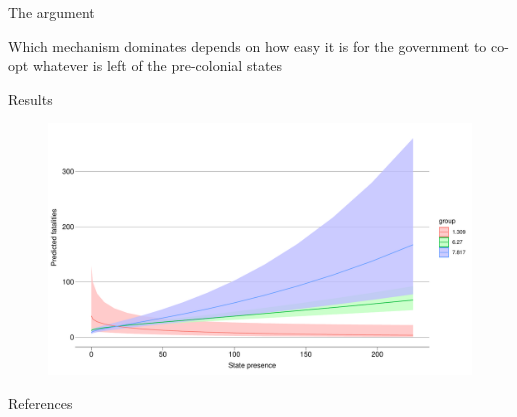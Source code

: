 \documentclass{beamer}
\begin{document}
\begin{frame}{The argument}

	Which mechanism dominates depends on how easy it is for the government
	to co-opt whatever is left of the pre-colonial states %

\end{frame}

\begin{frame}{Results}

	\begin{figure}[htpb]
		\centering
		\includegraphics[width=0.8\linewidth]{../R/Output/deathsIntPlot.pdf}
	\end{figure}

\end{frame}

\begin{frame}{References}

\small{


}

\end{frame}
\end{document}
